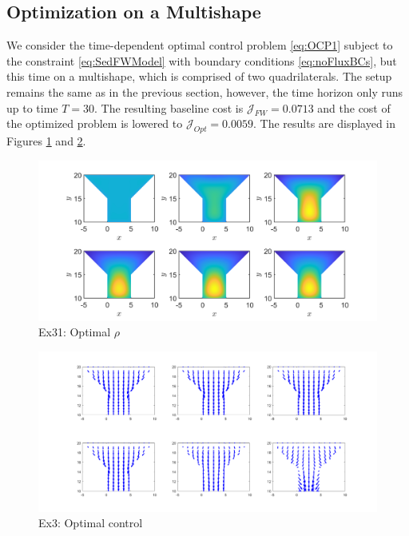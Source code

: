 \documentclass[final]{siamltex}
\begin{document}
\subsection{Optimization on a Multishape}
We consider the time-dependent optimal control problem \eqref{eq:OCP1} subject to the constraint \eqref{eq:SedFWModel} with boundary conditions \eqref{eq:noFluxBCs}, but this time on a multishape, which is comprised of two quadrilaterals.
The setup remains the same as in the previous section, however, the time horizon only runs up to time $T = 30$. The resulting baseline cost is $\mathcal J_{FW} = 0.0713$ and the cost of the optimized problem is lowered to $\mathcal J_{Opt} = 0.0059$. The results are displayed in Figures \ref{FM0} and \ref{FM0a}.
\begin{figure}[h]
	\centering
	\includegraphics[scale=0.25]{MultiOpt1a.png}
	\caption{Ex31: Optimal $\rho$} 
	\label{FM0}
\end{figure}
\begin{figure}[h]
	\centering
	\includegraphics[scale=0.25]{MultiCont1a.png}
	\caption{Ex3: Optimal control} 
	\label{FM0a}
\end{figure}
\end{document}
